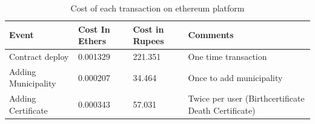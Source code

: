 \begin{table}[H]
    \normalsize
    \begin{center}
    \begin{tabular}{|m{3.5cm}| m{3.5cm}|m{3.5cm}|m{3.5cm}|}
        \hline
        \textbf{Event} & \textbf{Cost In Ethers} & \textbf{Cost in Rupees}& \textbf{Comments}\\
        \hline
        Contract deploy	& 0.001329 &221.351 &One time transaction\\
        \hline
        Adding Municipality &	0.000207 &	34.464&	Once to add municipality\\
        \hline
        Adding Certificate&0.000343	& 57.031 &Twice per user (Birthcertificate \+ Death Certificate)\\
        \hline
    \end{tabular}  
    \caption{Cost of each transaction on ethereum platform}
    \label{table-example}
    \end{center}
    \end{table}